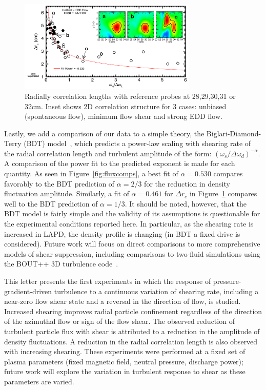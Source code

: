 \documentclass[aps,prl,amsmath,amssymb,preprint,superscriptaddress]{revtex4}
\begin{document}
\begin{figure}[!htbp]
\centerline{
\includegraphics[width=8.5cm]{radcorr}}
\caption{\label{fig:radcorr} Radially correlation lengths with
  reference probes at 28,29,30,31 or 32cm. Inset shows 2D correlation
  structure for 3 cases: unbiased (spontaneous flow), minimum flow
  shear and strong EDD flow.}
\end{figure}

Lastly, we add a comparison of our data to a simple theory, the
Biglari-Diamond-Terry (BDT) model~\cite{biglari90}, which predicts a
power-law scaling with shearing rate of the radial correlation length and turbulent
amplitude of the form: $\left(\omega_{s}/\Delta
\omega_{d}\right)^{-\alpha}$. A comparison of the power fit to the
predicted exponent is made for each quantity. As seen in
Figure~\ref{fig:fluxcomps}, a best fit of $\alpha = 0.530$ compares
favorably to the BDT prediction of $\alpha = 2/3$ for the reduction in
density fluctuation amplitude. Similarly, a fit of $\alpha = 0.461$
for $\Delta r_{c}$ in Figure~\ref{fig:radcorr} compares well to the BDT
prediction of $\alpha = 1/3$.   It should be noted, however, that the
BDT model is fairly simple and the validity of its assumptions is
questionable for the experimental conditions reported here.  In
particular, as the shearing rate is increased in LAPD, the density
profile is changing (in BDT a fixed drive is considered).  Future work
will focus on direct comparisons to more comprehensive models of shear
suppression, including comparisons to two-fluid simulations using the
BOUT++ 3D turbulence code~\cite{umansky11}.  

This letter presents the first experiments in which the response of
pressure-gradient-driven turbulence to a continuous
variation of shearing rate, including a near-zero flow shear state and
a reversal in the direction of flow, is studied.  Increased shearing
improves radial particle confinement regardless of the direction of
the azimuthal flow or sign of the flow shear. The observed reduction of
turbulent particle flux with shear is attributed to a reduction in the
amplitude of density fluctuations.  A reduction in the radial
correlation length is also observed with increasing shearing. These
experiments were performed at a fixed set of plasma parameters (fixed
magnetic field, neutral pressure, discharge power); future work will
explore the variation in turbulent response to shear as these
parameters are varied.  
\end{document}

